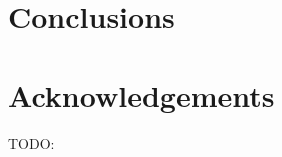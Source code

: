 \documentclass[letterpaper]{sig-alternate}
\begin{document}
\section{Conclusions}



\section{Acknowledgements}
 TODO:


\end{document}
